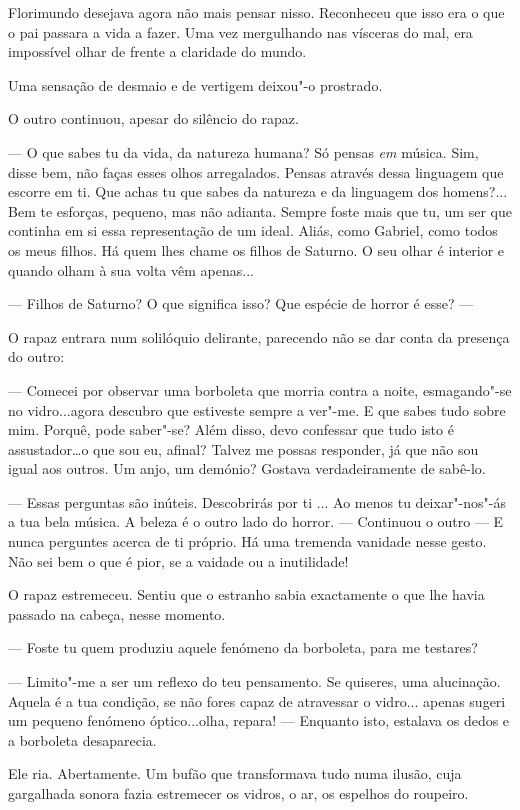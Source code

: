 Florimundo desejava agora não mais pensar nisso. Reconheceu que isso era
o que o pai passara a vida a fazer. Uma vez mergulhando nas vísceras do
mal, era impossível olhar de frente a claridade do mundo.

Uma sensação de desmaio e de vertigem deixou"-o prostrado.

O outro continuou, apesar do silêncio do rapaz.

--- O que sabes tu da vida, da natureza humana? Só pensas \emph{em}
música. Sim, disse bem, não faças esses olhos arregalados. Pensas
através dessa linguagem que escorre em ti. Que achas tu que sabes da
natureza e da linguagem dos homens?... Bem te esforças, pequeno, mas não
adianta. Sempre foste mais que tu, um ser que continha em si essa
representação de um ideal. Aliás, como Gabriel, como todos os meus
filhos. Há quem lhes chame os filhos de Saturno. O seu olhar é interior
e quando olham à sua volta vêm apenas...

--- Filhos de Saturno? O que significa isso? Que espécie de horror é esse?
--- 

O rapaz entrara num solilóquio delirante, parecendo não se dar conta da
presença do outro:

--- Comecei por observar uma borboleta que morria contra a noite,
esmagando"-se no vidro...agora descubro que estiveste sempre a ver"-me. E
que sabes tudo sobre mim. Porquê, pode saber"-se? Além disso, devo
confessar que tudo isto é assustador\ldots{}o que sou eu, afinal? Talvez
me possas responder, já que não sou igual aos outros. Um anjo, um
demónio? Gostava verdadeiramente de sabê-lo.

--- Essas perguntas são inúteis. Descobrirás por ti ... Ao menos tu
deixar"-nos"-ás a tua bela música. A beleza é o outro lado do horror. ---
Continuou o outro --- E nunca perguntes acerca de ti próprio. Há uma
tremenda vanidade nesse gesto. Não sei bem o que é pior, se a vaidade ou
a inutilidade!

O rapaz estremeceu. Sentiu que o estranho sabia exactamente o que lhe
havia passado na cabeça, nesse momento.

--- Foste tu quem produziu aquele fenómeno da borboleta, para me testares?

--- Limito"-me a ser um reflexo do teu pensamento. Se quiseres, uma
alucinação. Aquela é a tua condição, se não fores capaz de atravessar o
vidro... apenas sugeri um pequeno fenómeno óptico...olha, repara! ---
Enquanto isto, estalava os dedos e a borboleta desaparecia.

Ele ria. Abertamente. Um bufão que transformava tudo numa ilusão, cuja
gargalhada sonora fazia estremecer os vidros, o ar, os espelhos do
roupeiro.

